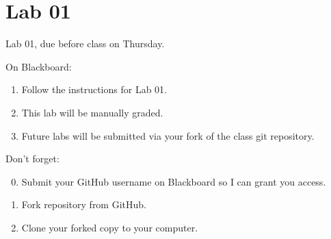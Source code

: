 \documentclass[14pt,aspectratio=1610]{beamer}
\begin{document}
\section{Lab 01}
\begin{frame}{Lab 01, due before class on Thursday.}

On Blackboard:
\begin{enumerate}
  \item Follow the instructions for Lab 01.
  \item This lab will be manually graded.
  \item Future labs will be submitted via your fork of the class git repository.
\end{enumerate}
\vspace{1em}

Don't forget:
\begin{enumerate}
  \setcounter{enumi}{-1}%
  \item Submit your GitHub username on Blackboard so I can grant you access.
  \item Fork repository from GitHub.
  \item Clone your forked copy to your computer.
\end{enumerate}
\end{frame}





\end{document}

